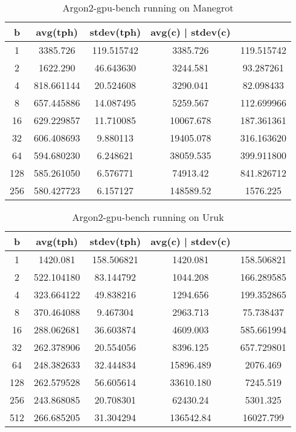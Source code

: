 \documentclass[nolof]{fithesis3}
\begin{document}
\noindent
\begin{table}
\caption{Argon2-gpu-bench running on Manegrot}
\label{tab:manegrot}
\begin{tabularx}{\textwidth}{| c | c | c | c | c |}
\hline
b & avg(tph) & stdev(tph) & avg(c) | stdev(c)\\
\hline
1 & 3385.726 & 119.515742 & 3385.726 & 119.515742\\
\hline
2 & 1622.290 & 46.643630 & 3244.581 & 93.287261\\
\hline
4 & 818.661144 & 20.524608 & 3290.041 & 82.098433\\
\hline
8 & 657.445886 & 14.087495 & 5259.567 & 112.699966\\
\hline
16 & 629.229857 & 11.710085 & 10067.678 & 187.361361\\
\hline
32 & 606.408693 & 9.880113 & 19405.078 & 316.163620\\
\hline
64 & 594.680230 & 6.248621 & 38059.535 & 399.911800\\
\hline
128 & 585.261050 & 6.576771 & 74913.42 & 841.826712\\
\hline
256 & 580.427723 & 6.157127 & 148589.52 & 1576.225\\
\hline
\end{tabularx}
\end{table}


\noindent
\begin{table}
\caption{Argon2-gpu-bench running on Uruk}
\label{tab:uruk}
\begin{tabularx}{\textwidth}{| c | c | c | c | c |}
\hline
b & avg(tph) & stdev(tph) & avg(c) | stdev(c)\\
\hline
1 & 1420.081 & 158.506821 & 1420.081 & 158.506821\\
\hline
2 & 522.104180 & 83.144792 & 1044.208 & 166.289585\\
\hline
4 & 323.664122 & 49.838216 & 1294.656 & 199.352865\\
\hline
8 & 370.464088 & 9.467304 & 2963.713 & 75.738437\\
\hline
16 & 288.062681 & 36.603874 & 4609.003 & 585.661994\\
\hline
32 & 262.378906 & 20.554056 & 8396.125 & 657.729801\\
\hline
64 & 248.382633 & 32.444834 & 15896.489 & 2076.469\\
\hline
128 & 262.579528 & 56.605614 & 33610.180 & 7245.519\\
\hline
256 & 243.868085 & 20.708301 & 62430.24 & 5301.325\\
\hline
512 & 266.685205 & 31.304294 & 136542.84 & 16027.799\\
\hline
\end{tabularx}
\end{table}
\end{document}
